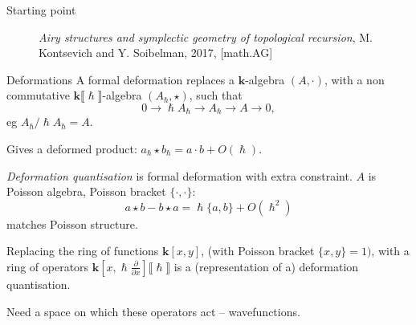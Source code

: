

        \begin{frame}{Starting point}
        \begin{figure}[b]
        \begin{minipage}{0.12\textwidth} 
            
        \end{minipage} 
        \hfill 
        \begin{minipage}{0.85\textwidth} 
        \raggedright
        \emph{Airy structures and symplectic geometry of  topological recursion}, M. Kontsevich and  Y. Soibelman, 2017, {\color{pink}{\tt arXiv:1701.09137}} [math.AG]
        \end{minipage}
        \end{figure} 
        \end{frame}
    
        
    
    
        \begin{frame}{Deformations}
        A formal deformation replaces a \( \mathbf{k} \)-algebra \((A,\cdot)\), with a non commutative \(\mathbf{k} \lBrack \hslash \rBrack \)-algebra \( (A_{\hslash},\star)\), such that
        \[ 0 \rightarrow \hslash A_{\hslash} \rightarrow A_{\hslash} \rightarrow A \rightarrow 0, \]
        eg \( A_{\hslash}/\hslash A_{\hslash} = A\).
        
        Gives a deformed product: \( a_{\hslash} \star b_{\hslash} = a \cdot b + O(\hslash)\).
        
        \emph{Deformation quantisation} is formal deformation with extra constraint. \(A\) is Poisson algebra, Poisson bracket \( \{ \cdot, \cdot\}\): 
        \[ a \star b - b \star a = \hslash \{ a, b\} + O(\hslash^2)\] 
        matches Poisson structure.
        
        \end{frame}    
            
        \begin{frame}
        \begin{ex}
        Replacing the ring of functions \( \mathbf{k}[x,y]\), (with Poisson bracket \(\{ x,y\}=1)\), with a ring of operators \( \mathbf{k}[x,\hslash \frac{\partial}{\partial x} ]\lBrack \hslash \rBrack \) is a (representation of a) deformation quantisation.
        \end{ex} 
        
        Need a space on which these operators act -- wavefunctions.

        \end{frame}
        
